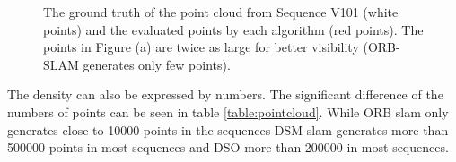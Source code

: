 	\begin{figure}%
    \centering
    \qquad
	\qquad
    \caption{The ground truth of the point cloud from Sequence V101 (white points) and the evaluated points by each algorithm (red points). 
	The points in Figure (a) are twice as large for better visibility (ORB-SLAM generates only few points). 
	}%
    \label{fig:pointcloud}%
	\end{figure}
	
	
	The density can also be expressed by numbers. The significant difference of the numbers of points can be seen in table \ref{table:pointcloud}. While 
	ORB slam only generates close to 10000 points in the sequences DSM slam generates more than 500000 points in most sequences and DSO more than 200000 
	in most sequences. 
	
